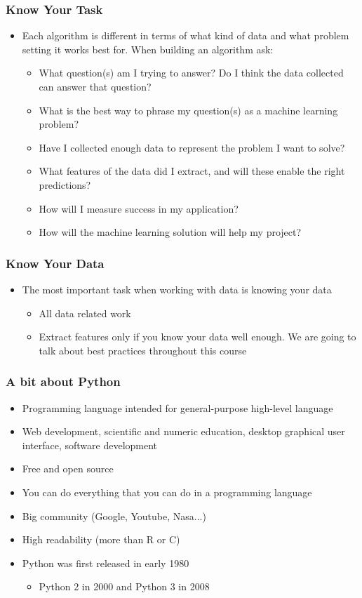\documentclass[compress, aspectratio=54]{beamer}
\begin{document}
\begin{frame}
\frametitle{Know Your Task}
\begin{itemize}
\item  Each algorithm is different in terms of what kind of data and what problem setting
it works best for. When building an algorithm ask: 
\begin{itemize}
\item What question(s) am I trying to answer? Do I think the data collected
can answer that question?
\item What is the best way to phrase my question(s) as a machine learning
problem?
\item Have I collected enough data to represent the problem I want to solve?
\item What features of the data did I extract, and will these enable the
right predictions?
\item How will I measure success in my application?
\item How will the machine learning solution will help my project?
\end{itemize}
\end{itemize}
\end{frame}


\begin{frame}
\frametitle{Know Your Data}
\begin{itemize}
\item The most important task when working with data is knowing your data
\begin{itemize}
\item All data related work 
\item Extract features only if you know your data well enough. We are going to talk about best practices throughout this course
\end{itemize}
\end{itemize}
\end{frame}


\begin{frame}
\frametitle{A bit about Python}
\begin{itemize}

\item Programming language intended for general-purpose high-level language
\item Web development, scientific and numeric education, desktop graphical user interface, software development
\item Free and open source 
\item You can do everything that you can do in a programming language
\item Big community (Google, Youtube, Nasa...)
\item High readability (more than R or C)
\item Python was first released in early 1980
\begin{itemize}

\item Python 2 in 2000 and Python 3 in 2008
\end{itemize}
\end{itemize}
\end{frame}
\end{document}

